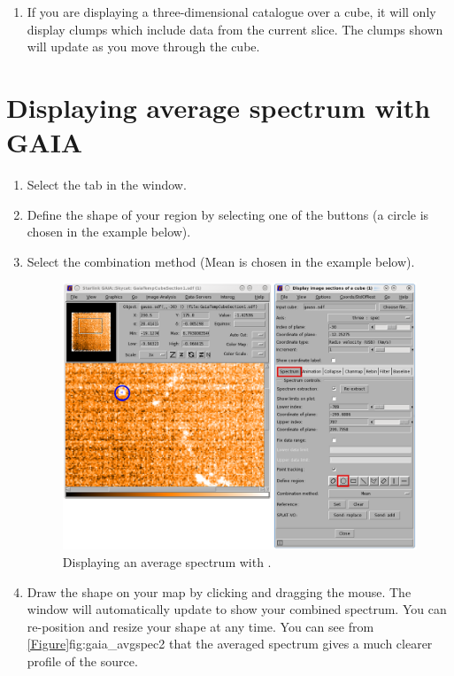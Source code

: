 \documentclass[11pt,oneside,chapters]{starlink}
\begin{document}
\begin{enumerate}[label=(\textbf{\arabic*})]
\item If you are displaying a three-dimensional catalogue over a cube,
it will only display clumps which include data from the current slice.
The clumps shown will update as you move through the cube.

\end{enumerate}

\section{Displaying average spectrum with GAIA}
\label{sec:gaiaaverage}

\begin{enumerate}[label=(\textbf{\arabic*})]
\item Select the  tab in the  window.

\item Define the shape of your region by selecting one of the
 buttons (a circle is chosen in the example
below).

\item Select the combination method (Mean is chosen in the example below).

\begin{figure}[h!]
\begin{center}
\includegraphics[width=0.8\linewidth]{sc20_gaia_avgspec1}
\end{center}
\caption[Displaying an average spectrum with \gaia.]{\label{fig:gaia_avgspec1}
  Displaying an average spectrum with \gaia.}
\end{figure}

\item Draw the shape on your map by clicking and dragging the mouse.
The  window will automatically update to show
your combined spectrum. You can re-position and resize your shape at
any time. You can see from \cref{Figure}{fig:gaia_avgspec2}{} that the
averaged spectrum gives a much clearer profile of the source.



\end{enumerate}
\end{document}
